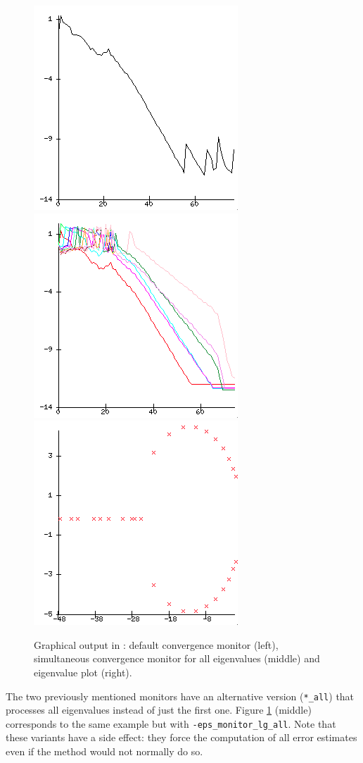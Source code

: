 \begin{figure}
  \includegraphics[width=.31\textwidth]{figures/monitor}
  \hfill
  \includegraphics[width=.31\textwidth]{figures/monitorall}
  \hfill
  \includegraphics[width=.31\textwidth]{figures/ploteigs}
  \caption{\label{fig:plot}Graphical output in \slepc: default convergence monitor (left), simultaneous convergence monitor for all eigenvalues (middle) and eigenvalue plot (right).}
\end{figure}

	The two previously mentioned monitors have an alternative version (\Verb!*_all!) that processes all eigenvalues instead of just the first one. Figure \ref{fig:plot} (middle) corresponds to the same example but with \Verb!-eps_monitor_lg_all!. Note that these variants have a side effect: they force the computation of all error estimates even if the method would not normally do so. 

